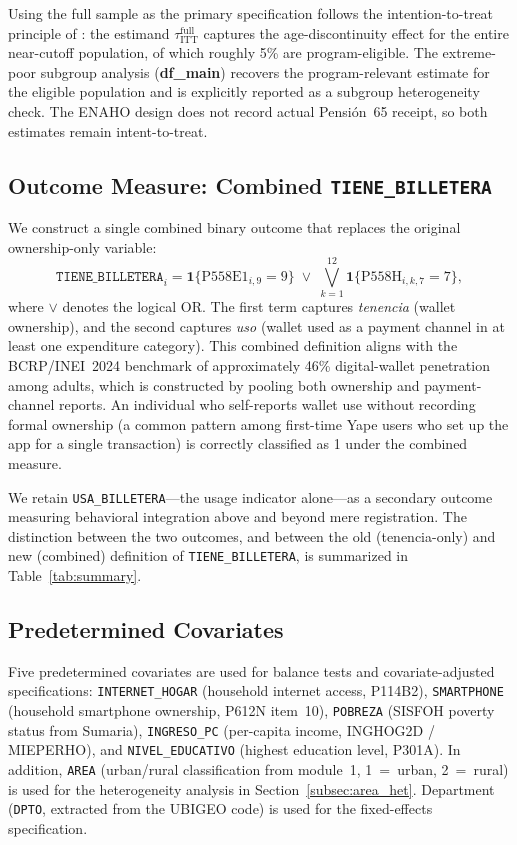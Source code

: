 \documentclass[12pt]{article}
\begin{document}
Using the full sample as the primary specification follows the
intention-to-treat principle of \citet{angrist2009}: the estimand
$\tau_{\text{ITT}}^{\text{full}}$ captures the age-discontinuity effect for
the entire near-cutoff population, of which roughly 5\% are program-eligible.
The extreme-poor subgroup analysis (\textbf{df\_main}) recovers the
program-relevant estimate for the eligible population and is explicitly
reported as a subgroup heterogeneity check. The ENAHO design does not record
actual Pensi\'on~65 receipt, so both estimates remain intent-to-treat.

\subsection{Outcome Measure: Combined \texttt{TIENE\_BILLETERA}}

We construct a single combined binary outcome that replaces the original
ownership-only variable:
\begin{equation}
\texttt{TIENE\_BILLETERA}_i = \mathbf{1}\{\text{P558E1}_{i,9} = 9\}
\;\lor\;
\bigvee_{k=1}^{12} \mathbf{1}\{\text{P558H}_{i,k,7} = 7\},
\label{eq:outcome}
\end{equation}
where $\lor$ denotes the logical OR. The first term captures \emph{tenencia}
(wallet ownership), and the second captures \emph{uso} (wallet used as a
payment channel in at least one expenditure category). This combined
definition aligns with the BCRP/INEI~2024 benchmark of approximately 46\%
digital-wallet penetration among adults, which is constructed by pooling
both ownership and payment-channel reports. An individual who self-reports
wallet use without recording formal ownership (a common pattern among
first-time Yape users who set up the app for a single transaction) is
correctly classified as 1 under the combined measure.

We retain \texttt{USA\_BILLETERA}---the usage indicator alone---as a
secondary outcome measuring behavioral integration above and beyond mere
registration. The distinction between the two outcomes, and between the
old (tenencia-only) and new (combined) definition of \texttt{TIENE\_BILLETERA},
is summarized in Table~\ref{tab:summary}.

\subsection{Predetermined Covariates}

Five predetermined covariates are used for balance tests and
covariate-adjusted specifications: \texttt{INTERNET\_HOGAR} (household
internet access, P114B2), \texttt{SMARTPHONE} (household smartphone
ownership, P612N item~10), \texttt{POBREZA} (SISFOH poverty status from
Sumaria), \texttt{INGRESO\_PC} (per-capita income, INGHOG2D / MIEPERHO),
and \texttt{NIVEL\_EDUCATIVO} (highest education level, P301A). In addition,
\texttt{AREA} (urban/rural classification from module~1, 1~=~urban,
2~=~rural) is used for the heterogeneity analysis in
Section~\ref{subsec:area_het}. Department (\texttt{DPTO}, extracted from
the UBIGEO code) is used for the fixed-effects specification.
\end{document}
